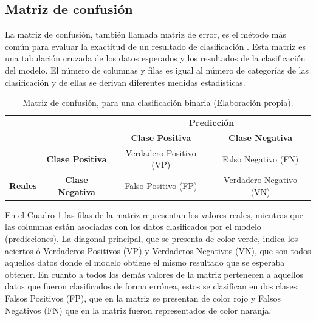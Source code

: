 \subsection{Matriz de confusi\'{o}n}

La matriz de confusi\'{o}n, tambi\'{e}n llamada matriz de error, es el m\'{e}todo m\'{a}s com\'{u}n para evaluar la exactitud de un resultado de clasificaci\'{o}n \cite{Reference61}. Esta matriz es una tabulaci\'{o}n cruzada de los datos esperados y los resultados de la clasificaci\'{o}n del modelo. El n\'{u}mero de columnas y filas es igual al n\'{u}mero de categor\'{i}as de las clasificaci\'{o}n y de ellas se derivan diferentes medidas estad\'{i}sticas.

\begin{table}[H]

\centering
\begin{center}
\begin{tabular}{ll|c|c|}
\cline{3-4}
                                                        &                                              & \multicolumn{2}{c|}{\textbf{Predicci\'{o}n}}                                                          \\ \cline{3-4} 
                                                        &                                              & \textbf{Clase Positiva}                         & \textbf{Clase Negativa}                         \\ \hline
\multicolumn{1}{|c|}{}                                  & \multicolumn{1}{c|}{\textbf{Clase Positiva}} & \cellcolor[HTML]{AADD99}Verdadero Positivo (VP) & \cellcolor[HTML]{FFCE93}Falso Negativo (FN)     \\ \cline{2-4} 
\multicolumn{1}{|c|}{\multirow{-2}{*}{\textbf{Reales}}} & \multicolumn{1}{c|}{\textbf{Clase Negativa}} & \cellcolor[HTML]{DF9F9F}Falso Positivo (FP)     & \cellcolor[HTML]{AADD99}Verdadero Negativo (VN) \\ \hline
\end{tabular}
\caption{Matriz de confusi\'{o}n, para una clasificaci\'{o}n binaria (Elaboraci\'{o}n propia).}
\label{table:matriz}
\end{center}
\end{table}

\vspace{5mm} %

En el Cuadro \ref{table:matriz} las filas de la matriz representan los valores reales, mientras que las columnas est\'{a}n asociadas con los datos clasificados por el modelo (predicciones). La diagonal principal, que se presenta de color verde, indica los aciertos \'{o} Verdaderos Positivos (VP) y Verdaderos Negativos (VN), que son todos aquellos datos donde el modelo obtiene el mismo resultado que se esperaba obtener. En cuanto a todos los dem\'{a}s valores de la matriz pertenecen a aquellos datos que fueron clasificados de forma err\'{o}nea, estos se clasifican en dos clases: Falsos Positivos (FP), que en la matriz se presentan de color rojo y Falsos Negativos (FN) que en la matriz fueron representados de color naranja.


